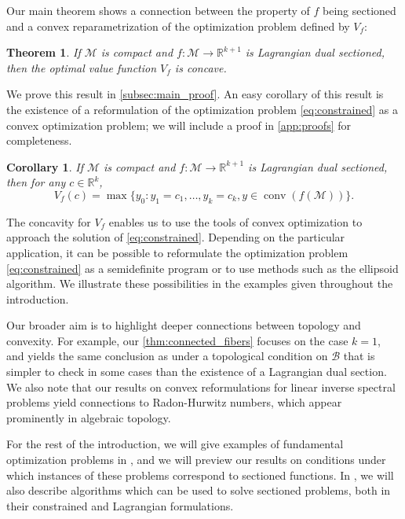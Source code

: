 \documentclass{article}
\numberwithin{equation}{section}
\newcommand{\cB}{\mathcal{B}}
\newcommand{\R}{\mathbb{R}}
\DeclareMathOperator*{\conv}{conv}
\newtheorem{theorem}{Theorem}[section]
\newtheorem{corollary}{Corollary}[section]
\newcommand{\cM}{{\mathcal{M}}}
\renewcommand{\cB}{\mathcal{B}}
\newcommand{\Voptf}{V_{f}}
\begin{document}
Our main theorem shows a connection between the property of $f$ being sectioned and a convex reparametrization of the optimization problem defined by $V_f$:

\begin{theorem}
    \label{thm:hidden_cvx}
    If $\cM$ is compact and  $f : \cM \rightarrow \R^{k+1}$ is Lagrangian dual sectioned, then
    the optimal value function $\Voptf$ is concave.
\end{theorem}
We prove this result in \cref{subsec:main_proof}.
An easy corollary of this result is the existence of a reformulation of the optimization problem \eqref{eq:constrained} as a convex optimization problem; we will include a proof in \cref{app:proofs} for completeness.

\begin{corollary}
    \label{cor:convex_reform}
    If $\cM$ is compact and  $f : \cM \rightarrow \R^{k+1}$ is Lagrangian dual sectioned, then for any $c \in \R^k$,
    \[
        \Voptf(c) = \max \{y_0 : y_1 = c_1, \dots, y_k = c_k, y \in \conv(f(\cM))\}.
    \]
\end{corollary}


The concavity for $\Voptf$ enables us to use the tools of convex optimization to approach the solution of \eqref{eq:constrained}.
Depending on the particular application, it can be possible to reformulate the optimization problem \eqref{eq:constrained} as a semidefinite program or to use methods such as the ellipsoid algorithm.  We illustrate these possibilities in the examples given throughout the introduction.

Our broader aim is to highlight deeper connections between topology and convexity. For example, our \cref{thm:connected_fibers} focuses on the case $k=1$, and yields the same conclusion as 
 under a topological condition on $\cB$ that is simpler to check in some cases than the existence of a Lagrangian dual section. We also note that our results on convex reformulations for linear inverse spectral problems yield connections to Radon-Hurwitz numbers, which appear prominently in algebraic topology.

For the rest of the introduction, we will give examples of fundamental optimization problems in , and we will preview our results on conditions under which instances of these problems correspond to sectioned functions.
In , we will also describe algorithms which can be used to solve sectioned problems, both in their constrained and Lagrangian formulations.
\end{document}
